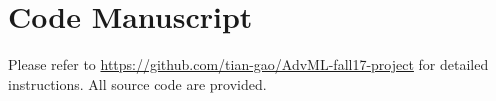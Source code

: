 \chapter{Code Manuscript}
\label{app:readme}


Please refer to \url{https://github.com/tian-gao/AdvML-fall17-project} for detailed instructions.
All source code are provided.
